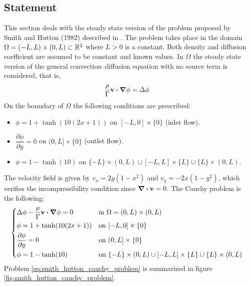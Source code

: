 
\subsection{Statement}

This section deals with the steady state version of the problem proposed by Smith and Hutton (1982) described in \cite{smith1982numerical}. The problem takes place in the domain $\Omega = (-L,L) \times (0,L) \subset \mathbb{R}^2$ where $L > 0$ is a constant. Both density and diffusion coefficient are assumed to be constant and known values. In $\Omega$ the steady state version of the general convection--diffusion equation with no source term is considered, that is,
\begin{equation}
	\frac{\rho}{\Gamma} \vb{v} \vdot \grad{\phi} = \Delta{\phi}
\end{equation}
On the boundary of $\Omega$ the following conditions are prescribed:
\begin{itemize}[topsep=0pt]
	\item $\phi = 1 + \tanh(10(2x+1))$ on $[-L,0] \times \{ 0 \}$ (inlet flow).
	\item $\dfrac{\partial \phi}{\partial y} = 0$ on $(0,L] \times \{ 0 \}$ (outlet flow).
	\item $\phi = 1 - \tanh(10)$ on $\{ -L \} \times (0,L) \cup [-L,L] \times \{ L \} \cup \{ L \} \times (0,L)$.
\end{itemize}
The velocity field is given by $v_x = 2 y (1 - x^2)$ and $v_y = -2 x (1 - y^2)$, which verifies the incompressibility condition since $\div{\vb{v}} = 0$. The Cauchy problem is the following:
\begin{equation} \label{eq:smith_hutton_cauchy_problem}
	\left\{
	\begin{aligned}
		&\Delta \phi - \frac{\rho}{\Gamma} \vb{v} \vdot \grad{\phi} = 0 &
		&\text{in } \Omega = (0,L) \times (0,L) \\
		&\phi = 1 + \tanh(10(2x+1)) & 
		&\text{on } [-L,0] \times \{ 0 \} \\
		&\frac{\partial \phi}{\partial y} = 0 & 
		&\text{on } (0,L] \times \{ 0 \} \\
		&\phi = 1 - \tanh(10) & 
		&\text{on } \{ -L \} \times (0,L) \cup [-L,L] \times \{ L \} \cup \{ L \} \times (0,L)
	\end{aligned}
	\right.
\end{equation}
Problem \eqref{eq:smith_hutton_cauchy_problem} is summarized in figure \ref{fig:smith_hutton_cauchy_problem}.

